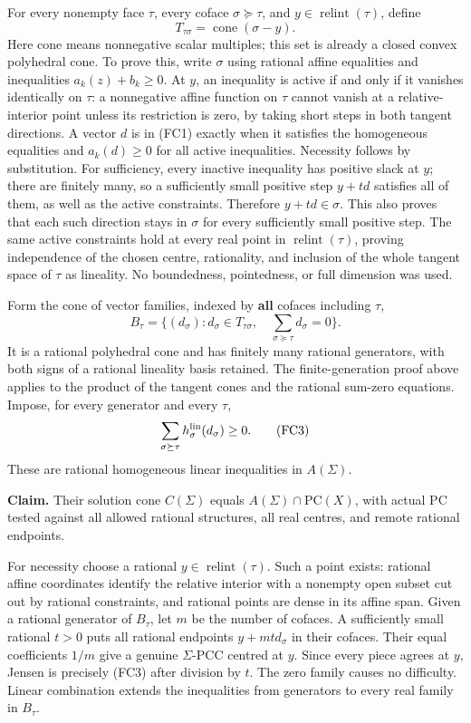 \documentclass[
  11pt,
]{article}
\begin{document}
For every nonempty face \(\tau\), every coface \(\sigma\succeq\tau\),
and \(y\in\operatorname{relint}(\tau)\), define \[
 T_{\tau\sigma}=\operatorname{cone}(\sigma-y).                 \tag{FC1}
\] Here cone means nonnegative scalar multiples; this set is already a
closed convex polyhedral cone. To prove this, write \(\sigma\) using
rational affine equalities and inequalities \(a_k(z)+b_k\geq0\). At
\(y\), an inequality is active if and only if it vanishes identically on
\(\tau\): a nonnegative affine function on \(\tau\) cannot vanish at a
relative-interior point unless its restriction is zero, by taking short
steps in both tangent directions. A vector \(d\) is in (FC1) exactly
when it satisfies the homogeneous equalities and \(a_k(d)\geq0\) for all
active inequalities. Necessity follows by substitution. For sufficiency,
every inactive inequality has positive slack at \(y\); there are
finitely many, so a sufficiently small positive step \(y+t d\) satisfies
all of them, as well as the active constraints. Therefore
\(y+t d\in\sigma\). This also proves that each such direction stays in
\(\sigma\) for every sufficiently small positive step. The same active
constraints hold at every real point in \(\operatorname{relint}(\tau)\),
proving independence of the chosen centre, rationality, and inclusion of
the whole tangent space of \(\tau\) as lineality. No boundedness,
pointedness, or full dimension was used.

Form the cone of vector families, indexed by \textbf{all} cofaces
including \(\tau\), \[
 B_\tau=\{(d_\sigma):d_\sigma\in T_{\tau\sigma},\quad
                              \sum_{\sigma\succeq\tau}d_\sigma=0\}.
                                                               \tag{FC2}
\] It is a rational polyhedral cone and has finitely many rational
generators, with both signs of a rational lineality basis retained. The
finite-generation proof above applies to the product of the tangent
cones and the rational sum-zero equations. Impose, for every generator
and every \(\tau\), \[
                \sum_{\sigma\succeq\tau}h_\sigma^{\rm lin}(d_\sigma)
                                  \geq0.                       \tag{FC3}
\] These are rational homogeneous linear inequalities in \(A(\Sigma)\).

\textbf{Claim.} Their solution cone \(C(\Sigma)\) equals
\(A(\Sigma)\cap\mathrm{PC}(X)\), with actual PC tested against all
allowed rational structures, all real centres, and remote rational
endpoints.

For necessity choose a rational \(y\in\operatorname{relint}(\tau)\).
Such a point exists: rational affine coordinates identify the relative
interior with a nonempty open subset cut out by rational constraints,
and rational points are dense in its affine span. Given a rational
generator of \(B_\tau\), let \(m\) be the number of cofaces. A
sufficiently small rational \(t>0\) puts all rational endpoints
\(y+mt d_\sigma\) in their cofaces. Their equal coefficients \(1/m\)
give a genuine \(\Sigma\)-PCC centred at \(y\). Since every piece agrees
at \(y\), Jensen is precisely (FC3) after division by \(t\). The zero
family causes no difficulty. Linear combination extends the inequalities
from generators to every real family in \(B_\tau\).
\end{document}
